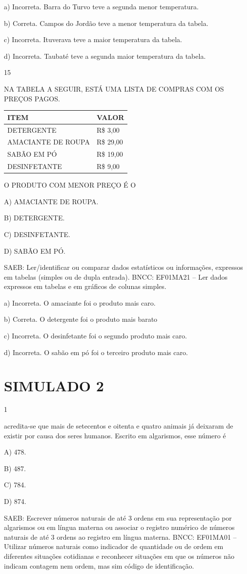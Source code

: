 a) Incorreta. Barra do Turvo teve a segunda menor temperatura.

b) Correta. Campos do Jordão teve a menor temperatura da tabela.

c) Incorreta. Ituverava teve a maior temperatura da tabela.

d) Incorreta. Taubaté teve a segunda maior temperatura da tabela.

\num{15}

NA TABELA A SEGUIR, ESTÁ UMA LISTA DE COMPRAS COM OS PREÇOS PAGOS.

\begin{longtable}[]{@{}ll@{}}
\toprule
ITEM & VALOR\tabularnewline
\midrule
\endhead
DETERGENTE & R\$ 3,00\tabularnewline
AMACIANTE DE ROUPA & R\$ 29,00\tabularnewline
SABÃO EM PÓ & R\$ 19,00\tabularnewline
DESINFETANTE & R\$ 9,00\tabularnewline
\bottomrule
\end{longtable}

O PRODUTO COM MENOR PREÇO É O

A) AMACIANTE DE ROUPA.

B) DETERGENTE.

C) DESINFETANTE.

D) SABÃO EM PÓ.

SAEB: Ler/identificar ou comparar dados estatísticos ou
informações, expressos em tabelas (simples ou de dupla entrada).
BNCC: EF01MA21 -- Ler dados expressos em tabelas e em gráficos de colunas
simples.

a) Incorreta. O amaciante foi o produto mais caro.

b) Correta. O detergente foi o produto mais barato

c) Incorreta. O desinfetante foi o segundo produto mais caro.

d) Incorreta. O sabão em pó foi o terceiro produto mais caro.

\chapter{SIMULADO 2}

\num{1}

acredita-se que mais de setecentos e oitenta e quatro animais já
deixaram de existir por causa dos seres humanos. Escrito em algarismos, esse número é

A) 478.

B) 487.

C) 784.

D) 874.

SAEB: Escrever números naturais de até 3 ordens em sua
representação por algarismos ou em língua materna ou associar o registro
numérico de números naturais de até 3 ordens ao registro em língua
materna.
BNCC: EF01MA01 -- Utilizar números naturais como indicador de quantidade
ou de ordem em diferentes situações cotidianas e reconhecer situações em
que os números não indicam contagem nem ordem, mas sim código de
identificação.

